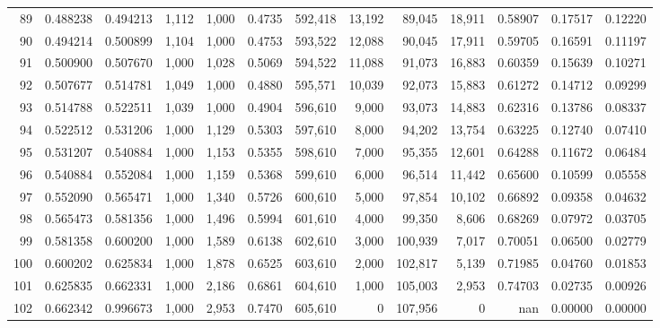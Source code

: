 \begin{tabular}{rrrrrrrrrrrrr}
89  &  0.488238 &  0.494213 &   1,112 &  1,000 &                                     0.4735 &  592,418 &   13,192 &   89,045 &   18,911 &  0.58907 &  0.17517 &  0.12220 \\
90  &  0.494214 &  0.500899 &   1,104 &  1,000 &                                     0.4753 &  593,522 &   12,088 &   90,045 &   17,911 &  0.59705 &  0.16591 &  0.11197 \\
91  &  0.500900 &  0.507670 &   1,000 &  1,028 &                                     0.5069 &  594,522 &   11,088 &   91,073 &   16,883 &  0.60359 &  0.15639 &  0.10271 \\
92  &  0.507677 &  0.514781 &   1,049 &  1,000 &                                     0.4880 &  595,571 &   10,039 &   92,073 &   15,883 &  0.61272 &  0.14712 &  0.09299 \\
93  &  0.514788 &  0.522511 &   1,039 &  1,000 &                                     0.4904 &  596,610 &    9,000 &   93,073 &   14,883 &  0.62316 &  0.13786 &  0.08337 \\
94  &  0.522512 &  0.531206 &   1,000 &  1,129 &                                     0.5303 &  597,610 &    8,000 &   94,202 &   13,754 &  0.63225 &  0.12740 &  0.07410 \\
95  &  0.531207 &  0.540884 &   1,000 &  1,153 &                                     0.5355 &  598,610 &    7,000 &   95,355 &   12,601 &  0.64288 &  0.11672 &  0.06484 \\
96  &  0.540884 &  0.552084 &   1,000 &  1,159 &                                     0.5368 &  599,610 &    6,000 &   96,514 &   11,442 &  0.65600 &  0.10599 &  0.05558 \\
97  &  0.552090 &  0.565471 &   1,000 &  1,340 &                                     0.5726 &  600,610 &    5,000 &   97,854 &   10,102 &  0.66892 &  0.09358 &  0.04632 \\
98  &  0.565473 &  0.581356 &   1,000 &  1,496 &                                     0.5994 &  601,610 &    4,000 &   99,350 &    8,606 &  0.68269 &  0.07972 &  0.03705 \\
99  &  0.581358 &  0.600200 &   1,000 &  1,589 &                                     0.6138 &  602,610 &    3,000 &  100,939 &    7,017 &  0.70051 &  0.06500 &  0.02779 \\
100 &  0.600202 &  0.625834 &   1,000 &  1,878 &                                     0.6525 &  603,610 &    2,000 &  102,817 &    5,139 &  0.71985 &  0.04760 &  0.01853 \\
101 &  0.625835 &  0.662331 &   1,000 &  2,186 &                                     0.6861 &  604,610 &    1,000 &  105,003 &    2,953 &  0.74703 &  0.02735 &  0.00926 \\
102 &  0.662342 &  0.996673 &   1,000 &  2,953 &                                     0.7470 &  605,610 &        0 &  107,956 &        0 &      nan &  0.00000 &  0.00000 \\
\bottomrule
\end{tabular}
